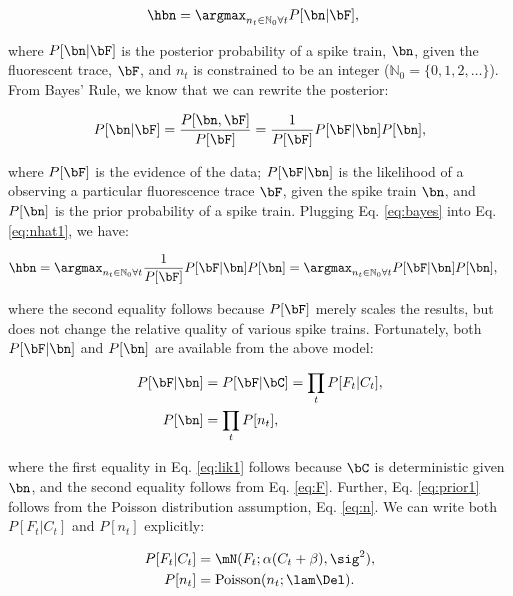 \begin{align} \label{eq:nhat1} 
\hbn &=  \anx P[\bn | \bF], 
\end{align}

\noindent where $P[\bn | \bF]$ is the posterior probability of a spike train, $\bn$, given the fluorescent trace, $\bF$, and $n_t$ is constrained to be an integer ($\mathbb{N}_0=\{0,1,2,\ldots\}$).  From Bayes' Rule, we know that we can rewrite the posterior:

\begin{align} \label{eq:bayes}
P[\bn | \bF] = \frac{P[\bn, \bF]}{P[\bF]} = \frac{1}{P[\bF]} P[\bF | \bn] P[\bn],
\end{align}

\noindent where $P[\bF]$ is the evidence of the data; $P[\bF | \bn]$ is the likelihood of a observing a particular fluorescence trace $\bF$, given the spike train $\bn$, and $P[\bn]$ is the prior probability of a spike train.  Plugging Eq. \eqref{eq:bayes} into Eq. \eqref{eq:nhat1}, we have:

\begin{align} \label{eq:nhat2} 
\hbn &=  \anx \frac{1}{P[\bF]} P[\bF | \bn] P[\bn] =  \anx  P[\bF | \bn] P[\bn],
\end{align}

\noindent where the second equality follows because $P[\bF]$ merely scales the results, but does not change the relative quality of various spike trains.  Fortunately, both $P[\bF | \bn]$ and $P[\bn]$ are available from the above model:

\begin{subequations} \label{eq:post1}
\begin{align}
P[\bF | \bn]&= P[\bF | \bC] 	= \prod_t P[F_t | C_t], \label{eq:lik1} \\ 
P[\bn] 		&= \prod_t P[n_t], \label{eq:prior1}
\end{align}
\end{subequations}

\noindent where the first equality in Eq. \eqref{eq:lik1} follows because $\bC$ is deterministic given $\bn$, and the second equality follows from Eq. \eqref{eq:F}. Further, Eq. \eqref{eq:prior1} follows from the Poisson distribution assumption, Eq. \eqref{eq:n}.  We can write both $P[F_t | C_t]$ and $P[n_t]$ explicitly:

\begin{subequations} \label{eq:post2}
\begin{align}
P[F_t | C_t] &= \mN(F_t; \alpha(C_t+\beta),\sig^2), \label{eq:lik2} \\
P[n_t] &= \text{Poisson}(n_t; \lam \Del). \label{eq:prior2} 
\end{align}
\end{subequations}

